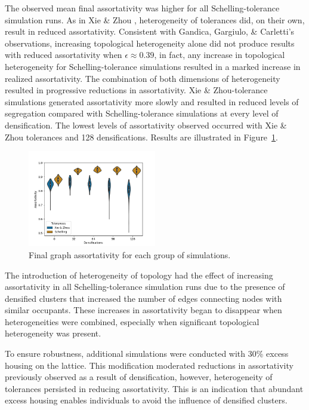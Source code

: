 \documentclass[a4paper]{article}
\begin{document}
The observed mean final assortativity was higher for all Schelling-tolerance simulation runs. As in Xie \& Zhou \cite{xie2012modeling}, heterogeneity of tolerances did, on their own, result in reduced assortativity.  Consistent with Gandica, Gargiulo, \& Carletti’s \cite{gandica2016can} observations, increasing topological heterogeneity alone did not produce results with reduced assortativity when $\epsilon\approx0.39$, in fact, any increase in topological heterogeneity for Schelling-tolerance simulations resulted in a marked increase in realized assortativity. The combination of both dimensions of heterogeneity resulted in progressive reductions in assortativity. Xie \& Zhou-tolerance simulations generated assortativity more slowly and resulted in reduced levels of segregation compared with Schelling-tolerance simulations at every level of densification. The lowest levels of assortativity observed occurred with Xie \& Zhou \cite{xie2012modeling} tolerances and 128 densifications. Results are illustrated in Figure~\ref*{fig:fig1}.

\begin{figure}[H]
    \centering
    \includegraphics[width=0.5\textwidth]{fig1.png}
    \caption{Final graph assortativity for each group of simulations.}
    \label{fig:fig1}
\end{figure}

The introduction of heterogeneity of topology had the effect of increasing assortativity in all Schelling-tolerance simulation runs due to the presence of densified clusters that increased the number of edges connecting nodes with similar occupants. These increases in assortativity began to disappear when heterogeneities were combined, especially when significant topological heterogeneity was present. 

To ensure robustness, additional simulations were conducted with 30\% excess housing on the lattice. This modification moderated reductions in assortativity previously observed as a result of densification, however, heterogeneity of tolerances persisted in reducing assortativity. This is an indication that abundant excess housing enables individuals to avoid the influence of densified clusters. 
\end{document}

